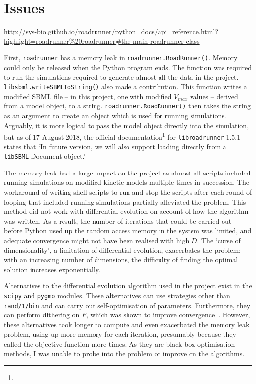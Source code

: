 \documentclass[parskip=full, numbers=noenddot]{scrreprt}
\begin{document}
\section{Issues}
\label{sec:issues}

\urldef\myurl\url{http://sys-bio.github.io/roadrunner/python_docs/api_reference.html?highlight=roadrunner%20roadrunner#the-main-roadrunner-class}

First, \texttt{roadrunner} has a memory leak in \texttt{road\-runner.\-Road\-Runner\-()}. Memory could only be released when the Python program ends. The function was required to run the simulations required to generate almost all the data in the project. \texttt{libsbml\-.write\-SBML\-To\-String\-()} also made a contribution. This function writes a modified SBML file -- in this project, one with modified $V_{max}$ values -- derived from a model object, to a string. \texttt{road\-runner.\-Road\-Runner\-()} then takes the string as an argument to create an object which is used for running simulations. Arguably, it is more logical to pass the model object directly into the simulation, but as of 17 August 2018, the official documentation\footnote{\myurl} for \texttt{libroadrunner} 1.5.1 states that `In future version, we will also support loading directly from a \texttt{libSBML} Document object.'

The memory leak had a large impact on the project as almost all scripts included running simulations on modified kinetic models multiple times in succession. The workaround of writing shell scripts to run and stop the scripts after each round of looping that included running simulations partially alleviated the problem. This method did not work with differential evolution on account of how the algorithm was written. As a result, the number of iterations that could be carried out before Python used up the random access memory in the system was limited, and adequate convergence might not have been realised with high $D$. The `curse of dimensionality', a limitation of differential evolution, exacerbates the problem: with an increasing number of dimensions, the difficulty of finding the optimal solution increases exponentially.

Alternatives to the differential evolution algorithm used in the project exist in the \texttt{scipy} and \texttt{pygmo} modules. These alternatives can use strategies other than \texttt{rand/1/bin} and can carry out self-optimisation of parameters. Furthermore, they can perform dithering on $F$, which was shown to improve convergence~\cite{storn_usage_1996}. However, these alternatives took longer to compute and even exacerbated the memory leak problem, using up more memory for each iteration, presumably because they called the objective function more times. As they are black-box optimisation methods, I was unable to probe into the problem or improve on the algorithms.
\end{document}
